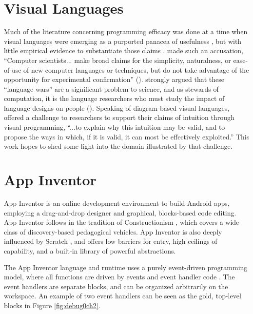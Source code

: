 \section{Visual Languages}
\label{sec:visual-languages}

Much of the literature concerning programming efficacy was done at a time when visual languages were emerging as a purported panacea of usefulness \citep{shu-1988}, but with little empirical evidence to substantiate those claims \citep{petre-1995}. \citeauthor{sch-1980} made such an accusation, ``Computer scientists... make broad claims for the simplicity, naturalness, or ease-of-use of new computer languages or techniques, but do not take advantage of the opportunity for experimental confirmation'' (\citeyear{sch-1980}). \citeauthor{stefik2014programming} strongly argued that these ``language wars'' are a significant problem to science, and as stewards of computation, it is the language researchers who must study the impact of language designs on people (\citeyear{stefik2014programming}). Speaking of diagram-based visual languages, \citet{blackwell-2001} offered a challenge to researchers to support their claims of intuition through visual programming, ``...to explain why this intuition may be valid, and to propose the ways in which, if it is valid, it can most be effectively exploited.'' This work hopes to shed some light into the domain illustrated by that challenge. 


\section{App Inventor}
\label{sec:app-inventor-background}
App Inventor is an online development environment to build Android apps, employing a drag-and-drop designer and graphical, blocks-based code editing. App Inventor follows in the tradition of Constructionism \citep{papert1991situating}, which covers a wide class of discovery-based pedagogical vehicles. App Inventor is also deeply influenced by Scratch \citep{resnick2009scratch}, and offers low barriers for entry, high ceilings of capability, and a built-in library of powerful abstractions.

The App Inventor language and runtime uses a purely event-driven programming model, where all functions are driven by events and event handler code \citep{turbak-2014}. The event handlers are separate blocks, and can be organized arbitrarily on the workspace. An example of two event handlers can be seen as the gold, top-level blocks in Figure \ref{fig:debug0ch2}. 

